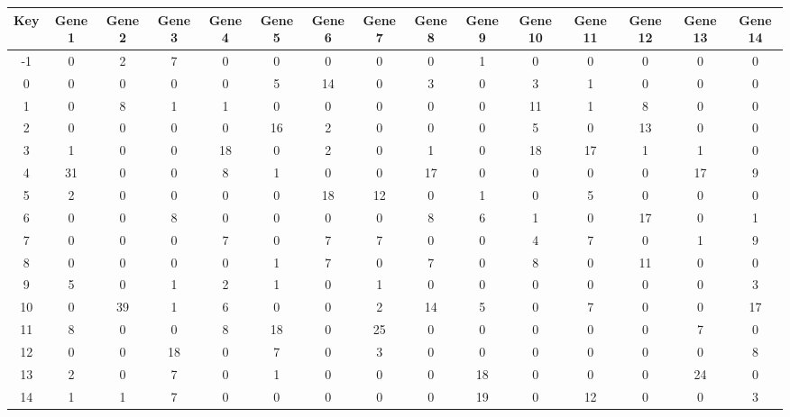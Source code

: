 \begin{tabular}{|c|c|c|c|c|c|c|c|c|c|c|c|c|c|c|}
\hline
Key & Gene 1 & Gene 2 & Gene 3 & Gene 4 & Gene 5 & Gene 6 & Gene 7 & Gene 8 & Gene 9 & Gene 10 & Gene 11 & Gene 12 & Gene 13 & Gene 14 \\
\hline
-1 & 0 & 2 & 7 & 0 & 0 & 0 & 0 & 0 & 1 & 0 & 0 & 0 & 0 & 0 \\
0 & 0 & 0 & 0 & 0 & 5 & 14 & 0 & 3 & 0 & 3 & 1 & 0 & 0 & 0 \\
1 & 0 & 8 & 1 & 1 & 0 & 0 & 0 & 0 & 0 & 11 & 1 & 8 & 0 & 0 \\
2 & 0 & 0 & 0 & 0 & 16 & 2 & 0 & 0 & 0 & 5 & 0 & 13 & 0 & 0 \\
3 & 1 & 0 & 0 & 18 & 0 & 2 & 0 & 1 & 0 & 18 & 17 & 1 & 1 & 0 \\
4 & 31 & 0 & 0 & 8 & 1 & 0 & 0 & 17 & 0 & 0 & 0 & 0 & 17 & 9 \\
5 & 2 & 0 & 0 & 0 & 0 & 18 & 12 & 0 & 1 & 0 & 5 & 0 & 0 & 0 \\
6 & 0 & 0 & 8 & 0 & 0 & 0 & 0 & 8 & 6 & 1 & 0 & 17 & 0 & 1 \\
7 & 0 & 0 & 0 & 7 & 0 & 7 & 7 & 0 & 0 & 4 & 7 & 0 & 1 & 9 \\
8 & 0 & 0 & 0 & 0 & 1 & 7 & 0 & 7 & 0 & 8 & 0 & 11 & 0 & 0 \\
9 & 5 & 0 & 1 & 2 & 1 & 0 & 1 & 0 & 0 & 0 & 0 & 0 & 0 & 3 \\
10 & 0 & 39 & 1 & 6 & 0 & 0 & 2 & 14 & 5 & 0 & 7 & 0 & 0 & 17 \\
11 & 8 & 0 & 0 & 8 & 18 & 0 & 25 & 0 & 0 & 0 & 0 & 0 & 7 & 0 \\
12 & 0 & 0 & 18 & 0 & 7 & 0 & 3 & 0 & 0 & 0 & 0 & 0 & 0 & 8 \\
13 & 2 & 0 & 7 & 0 & 1 & 0 & 0 & 0 & 18 & 0 & 0 & 0 & 24 & 0 \\
14 & 1 & 1 & 7 & 0 & 0 & 0 & 0 & 0 & 19 & 0 & 12 & 0 & 0 & 3 \\
\hline
\end{tabular}